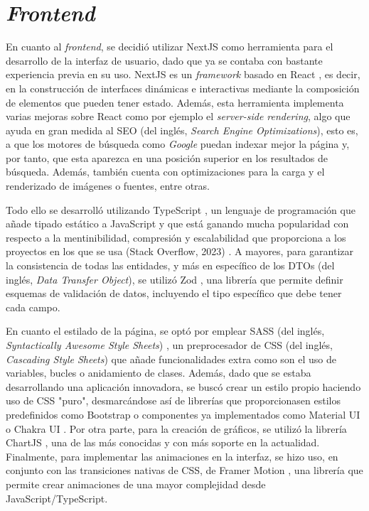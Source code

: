 \section{\textit{Frontend}}
\label{sec:herramientas_frontend}

En cuanto al \textit{frontend}, se decidió utilizar NextJS \cite{nextjs} como herramienta para el desarrollo de la interfaz de usuario, dado que ya
se contaba con bastante experiencia previa en su uso. NextJS es un \textit{framework} basado en React \cite{react}, es decir, en la construcción de interfaces dinámicas e interactivas mediante la composición
de elementos que pueden tener estado. Además, esta herramienta implementa varias mejoras sobre React como por ejemplo el \textit{server-side rendering}, algo que ayuda en gran medida
al SEO (del inglés, \textit{Search Engine Optimizations}), esto es, a que los motores de búsqueda como \textit{Google} puedan indexar mejor la página y, por tanto, que esta aparezca en una posición superior en los resultados de búsqueda.
Además, también cuenta con optimizaciones para la carga y el renderizado de imágenes o fuentes, entre otras.

\bigskip
Todo ello se desarrolló utilizando TypeScript \cite{typescript}, un lenguaje de programación que añade tipado estático a JavaScript
y que está ganando mucha popularidad con respecto a la mentinibilidad, compresión y escalabilidad que proporciona a los proyectos en los que se usa (Stack Overflow, 2023) \cite{stackoverflow2023}.
A mayores, para garantizar la consistencia de todas las entidades, y más en específico de los DTOs (del inglés, \textit{Data Transfer Object}), se utilizó Zod \cite{zod}, una librería que permite
definir esquemas de validación de datos, incluyendo el tipo específico que debe tener cada campo.

\bigskip
En cuanto el estilado de la página, se optó por emplear SASS (del inglés, \textit{Syntactically Awesome Style Sheets}) \cite{sass}, un preprocesador de CSS (del inglés, \textit{Cascading Style Sheets}) que añade
funcionalidades extra como son el uso de variables, bucles o anidamiento de clases. Además, dado que se estaba desarrollando
una aplicación innovadora, se buscó crear un estilo propio haciendo uso de CSS "puro", desmarcándose así de librerías que proporcionasen estilos predefinidos como Bootstrap \cite{bootstrap} o componentes ya implementados
como Material UI \cite{materialui} o Chakra UI \cite{chakraui}. Por otra parte, para la creación de gráficos, se utilizó la librería ChartJS \cite{chartjs}, una de las más conocidas
y con más soporte en la actualidad. Finalmente, para implementar las animaciones en la interfaz, se hizo uso, en conjunto con las transiciones nativas
de CSS, de Framer Motion \cite{framermotion}, una librería que permite crear animaciones de una mayor complejidad desde JavaScript/TypeScript.

